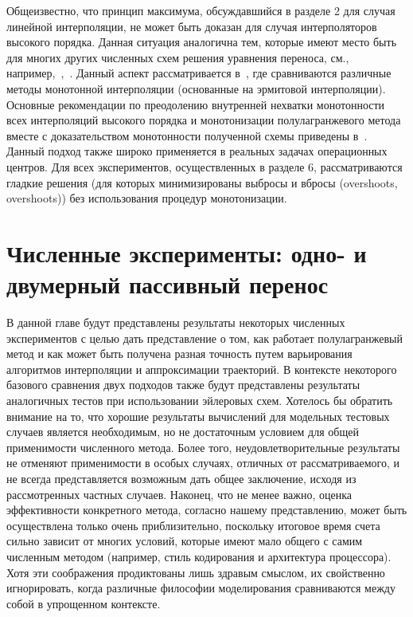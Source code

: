 Общеизвестно, что принцип максимума, обсуждавшийся в разделе 2 для случая линейной интерполяции, не может быть доказан для случая интерполяторов высокого порядка. Данная ситуация аналогична тем, которые имеют место быть для многих других численных схем решения уравнения переноса, см., например,~\cite{A32},~\cite{A56}. Данный аспект рассматривается в~\cite{A74}, где сравниваются различные методы монотонной интерполяции (основанные на эрмитовой интерполяции). Основные рекомендации по преодолению внутренней нехватки монотонности всех интерполяций высокого порядка и монотонизации полулагранжевого метода вместе с доказательством монотонности полученной схемы приведены в~\cite{A5}. Данный подход также широко применяется в реальных задачах операционных центров.
Для всех экспериментов, осуществленных в разделе 6, рассматриваются гладкие решения (для которых минимизированы выбросы и вбросы (overshoots, overshoots)) без использования процедур монотонизации.
\chapter{Численные эксперименты: одно- и двумерный пассивный перенос} \label{chapt_6}
В данной главе будут представлены результаты некоторых численных экспериментов с целью дать представление о том, как работает полулагранжевый метод и как может быть получена разная точность путем варьирования алгоритмов интерполяции и аппроксимации траекторий. В контексте некоторого базового сравнения двух подходов также будут представлены результаты аналогичных тестов при использовании эйлеровых схем. Хотелось бы обратить внимание на то, что хорошие результаты вычислений для модельных тестовых случаев является необходимым, но не достаточным условием для общей применимости численного метода. Более того, неудовлетворительные результаты не отменяют применимости в особых случаях, отличных от рассматриваемого, и не всегда представляется возможным дать общее заключение, исходя из рассмотренных частных случаев. Наконец, что не менее важно, оценка эффективности конкретного метода, согласно нашему представлению, может быть осуществлена только очень приблизительно, поскольку итоговое время счета сильно зависит от многих условий, которые имеют мало общего с самим численным методом (например, стиль кодирования и архитектура процессора). Хотя эти соображения продиктованы лишь здравым смыслом, их свойственно игнорировать, когда различные философии моделирования сравниваются между собой в упрощенном контексте.
